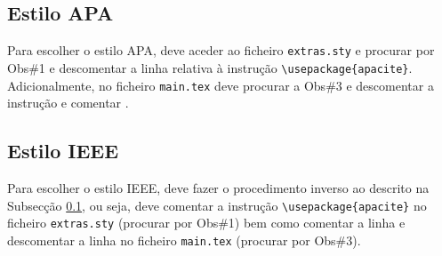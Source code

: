     \subsection{Estilo APA}
    \label{cap3:estiloAPA}
    
    Para escolher o estilo APA, deve aceder ao ficheiro \verb+extras.sty+ e procurar por Obs\#1 e descomentar a linha relativa à instrução \verb+\usepackage{apacite}+. \\
    Adicionalmente, no ficheiro \verb+main.tex+ deve procurar a Obs\#3 e descomentar a instrução \verb++ e comentar \verb++.
    
    \subsection{Estilo IEEE}
    Para escolher o estilo IEEE, deve fazer o procedimento inverso ao descrito na Subsecção \ref{cap3:estiloAPA}, ou seja, deve comentar a instrução \verb+\usepackage{apacite}+ no ficheiro \verb+extras.sty+ (procurar por Obs\#1) bem como comentar a linha \verb++ e descomentar a linha \verb++ no ficheiro \verb+main.tex+ (procurar por Obs\#3). 
    
    
    